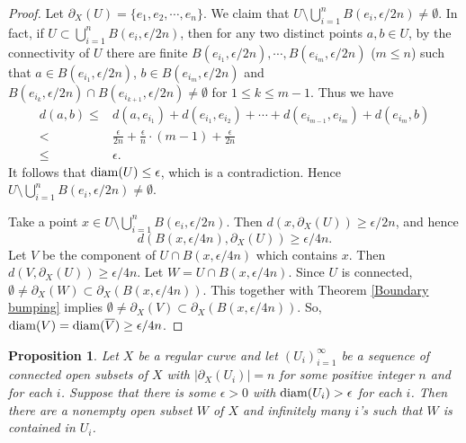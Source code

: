 \documentclass[12pt,a4paper]{amsart}
\newtheorem{lem}[thm]{Lemma}
\newtheorem{prop}[thm]{Proposition}
\theoremstyle{definition}
\numberwithin{equation}{section}
\begin{document}
\begin{proof}
Let $\partial_X(U)=\{e_1, e_2, \cdots, e_n\}$. We claim that $U\setminus\bigcup_{i=1}^{n}B(e_i,\epsilon/2n)\neq\emptyset$. In fact, if $U\subset\bigcup_{i=1}^{n}B(e_i,\epsilon/2n)$, then for any two distinct points $a,b\in U$, by the connectivity of $U$ there are finite $B(e_{i_1},\epsilon/2n), \cdots, B(e_{i_m},\epsilon/2n)$ ($m\leq n$) such that $a\in B(e_{i_1},\epsilon/2n)$, $b\in B(e_{i_m},\epsilon/2n)$ and $B(e_{i_k},\epsilon/2n)\cap B(e_{i_{k+1}},\epsilon/2n)\neq\emptyset$ for $1\leq k\leq m-1$. Thus we have
\begin{align*}
d(a,b)\leq & d(a,e_{i_1})+d(e_{i_1},e_{i_2})+\cdots +d(e_{i_{m-1}},e_{i_m})+d(e_{i_m},b)\\
< & \frac{\epsilon}{2n}+\frac{\epsilon}{n}\cdot(m-1)+\frac{\epsilon}{2n}\\
\leq & \epsilon.
\end{align*}
It follows that ${\rm diam}(U)\leq\epsilon$, which is a contradiction. Hence $U\setminus\bigcup_{i=1}^{n}B(e_i,\epsilon/2n)\neq\emptyset$.

Take a point $x\in U\setminus\bigcup_{i=1}^{n}B(e_i,\epsilon/2n)$. Then $d(x,\partial_X(U))\geq \epsilon/2n$, and hence
$$d(B(x,\epsilon/4n), \partial_X(U))\geq \epsilon/4n.$$
 Let $V$ be the component of $U\cap B(x,\epsilon/4n)$ which contains $x$. Then $d(V,\partial_X(U))\geq\epsilon/4n$. Let $W=U\cap B(x,\epsilon/4n).$
Since $U$ is connected, $\emptyset\not= \partial_X(W)\subset\partial_X(B(x,\epsilon/4n))$.
This together with Theorem \ref{Boundary bumping} implies $\emptyset\not= \partial_X(V)\subset \partial_X(B(x,\epsilon/4n))$.
 So, ${\rm diam}(V)={\rm diam}(\overline{V})\geq \epsilon/4n$.
\end{proof}



\begin{prop}\label{convergence continua}
Let $X$ be a regular curve and let $(U_i)_{i=1}^\infty$ be a sequence of connected open subsets of $X$ with $|\partial_X(U_i)|=n$ for some positive integer $n$ and for each $i$. Suppose that there is some $\epsilon>0$ with ${\rm diam}(U_i)>\epsilon$ for each $i$. Then there are a nonempty open subset $W$ of $X$ and infinitely many $i$'s such that $W$ is contained in $U_i$.
\end{prop}
\end{document}

